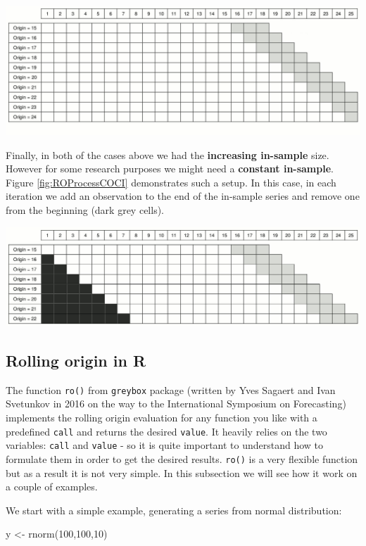 \documentclass[
]{book}
\newenvironment{Shaded}{\begin{snugshade}}{\end{snugshade}}
\newcommand{\DecValTok}[1]{\textcolor[rgb]{0.00,0.00,0.81}{#1}}
\newcommand{\FunctionTok}[1]{\textcolor[rgb]{0.00,0.00,0.00}{#1}}
\newcommand{\NormalTok}[1]{#1}
\newcommand{\OtherTok}[1]{\textcolor[rgb]{0.56,0.35,0.01}{#1}}
\theoremstyle{definition}
\theoremstyle{definition}
\theoremstyle{definition}
\theoremstyle{definition}
\theoremstyle{remark}
\begin{document}
\includegraphics{./images/03-ROProcessNoCO.jpg}

Finally, in both of the cases above we had the \textbf{increasing in-sample} size. However for some research purposes we might need a \textbf{constant in-sample}. Figure \ref{fig:ROProcessCOCI} demonstrates such a setup. In this case, in each iteration we add an observation to the end of the in-sample series and remove one from the beginning (dark grey cells).

\includegraphics{./images/03-ROProcessCOCI.jpg}

\hypertarget{rolling-origin-in-r}{%
\subsection{Rolling origin in R}\label{rolling-origin-in-r}}

The function \texttt{ro()} from \texttt{greybox} package (written by Yves Sagaert and Ivan Svetunkov in 2016 on the way to the International Symposium on Forecasting) implements the rolling origin evaluation for any function you like with a predefined \texttt{call} and returns the desired \texttt{value}. It heavily relies on the two variables: \texttt{call} and \texttt{value} - so it is quite important to understand how to formulate them in order to get the desired results. \texttt{ro()} is a very flexible function but as a result it is not very simple. In this subsection we will see how it work on a couple of examples.

We start with a simple example, generating a series from normal distribution:

\begin{Shaded}
\begin{Highlighting}[]
\NormalTok{y }\OtherTok{\textless{}{-}} \FunctionTok{rnorm}\NormalTok{(}\DecValTok{100}\NormalTok{,}\DecValTok{100}\NormalTok{,}\DecValTok{10}\NormalTok{)}
\end{Highlighting}
\end{Shaded}
\end{document}
